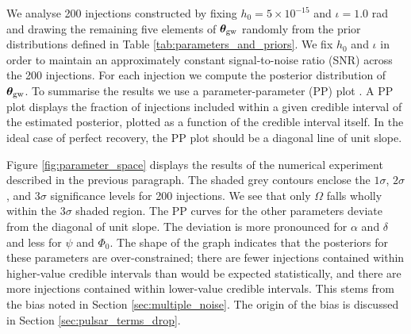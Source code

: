 \documentclass[fleqn,usenatbib,useAMS]{mnras}
\begin{document}
We analyse 200 injections constructed by fixing $h_0 = 5 \times 10^{-15}$ and $\iota =1.0$ rad and drawing the remaining five elements of $\boldsymbol{\theta}_{\rm gw}$ randomly from the prior distributions defined in Table \ref{tab:parameters_and_priors}. We fix $h_0$ and $\iota$ in order to maintain an approximately constant signal-to-noise ratio (SNR) across the 200 injections. For each injection we compute the posterior distribution of ${\boldsymbol{\theta}}_{\rm gw}$. To summarise the results we use a parameter-parameter (PP) plot \citep{doi:10.1198/106186006X136976}. A PP plot displays the fraction of injections included within a given credible interval of the estimated posterior, plotted as a function of the credible interval itself. In the ideal case of perfect recovery, the PP plot should be a diagonal line of unit slope. \newline 

Figure \ref{fig:parameter_space} displays the results of the numerical experiment described in the previous paragraph. The shaded grey contours enclose the $1\sigma$, $2\sigma$, and $3\sigma$ significance levels for 200 injections. We see that only $\Omega$ falls wholly within the $3\sigma$ shaded region. The PP curves for the other parameters deviate from the diagonal of unit slope. The deviation is more pronounced for $\alpha$ and $\delta$ and less for $\psi$ and $\Phi_0$. The shape of the graph indicates that the posteriors for these parameters are over-constrained; there are fewer injections contained within higher-value credible intervals than would be expected statistically, and there are more injections contained within lower-value credible intervals. This stems from the bias noted in Section \ref{sec:multiple_noise}. The origin of the bias is discussed in Section \ref{sec:pulsar_terms_drop}. 
\end{document}
